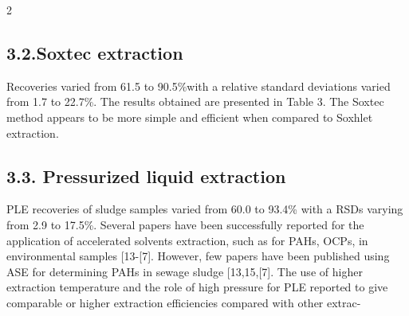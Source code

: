 \documentclass{article}
\begin{document}
\begin{paracol}{2}
\subsection*{3.2.Soxtec extraction}


Recoveries varied from 61.5 to 90.5\%with a relative
standard deviations varied from 1.7 to 22.7\%. The results
obtained are presented in Table 3. The Soxtec method appears
to be more simple and efficient when compared to Soxhlet
extraction.


\subsection*{3.3. Pressurized liquid extraction}


PLE recoveries of sludge samples varied from 60.0 to
93.4\% with a RSDs varying from 2.9 to 17.5\%.
Several papers have been successfully reported for the
application of accelerated solvents extraction, such as for
PAHs, OCPs, in environmental samples [13-[7]. However,
few papers have been published using ASE for determining
PAHs in sewage sludge [13,15,[7].
The use of higher extraction temperature and the role
of high pressure for PLE reported to give comparable or
higher extraction efficiencies compared with other extrac-

\end{paracol}
\end{document}
